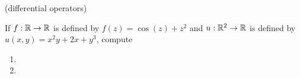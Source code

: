 (differential operators)

\nl If $f : \mathbb{R} \to \mathbb{R}$ is defined by $f(z) = \cos(z) + z^2$ and $u : \mathbb{R}^2 \to \mathbb{R}$ is defined by $u(x,y) = x^2y + 2x + y^3$, compute

\begin{enumerate}
\item 
\item 
\end{enumerate}
